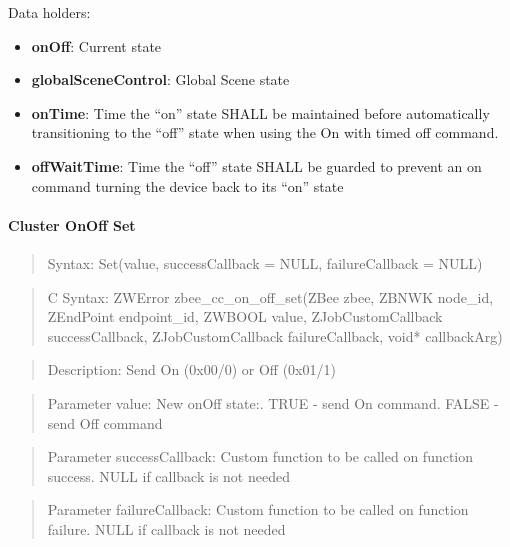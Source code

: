 \noindent
Data holders:

\begin{itemize}
\item \textbf{onOff}: Current state
\item \textbf{globalSceneControl}: Global Scene state
\item \textbf{onTime}: Time the “on” state SHALL be maintained before automatically transitioning to the “off” state when using the On with timed off command.
\item \textbf{offWaitTime}: Time the “off” state SHALL be guarded to prevent an on command turning the device back to its “on” state
\end{itemize}

\paragraph{Cluster OnOff Set}
\begin{quote}Syntax: Set(value, successCallback = NULL, failureCallback = NULL)\end{quote}
\begin{quote}C Syntax: ZWError zbee\_cc\_on\_off\_set(ZBee zbee, ZBNWK node\_id, ZEndPoint endpoint\_id, ZWBOOL value, ZJobCustomCallback successCallback, ZJobCustomCallback failureCallback, void* callbackArg)\end{quote}
\begin{quote}Description: Send On (0x00/0) or Off (0x01/1)\end{quote}
\begin{quote}Parameter value: New onOff state:. TRUE  - send On command. FALSE - send Off command\end{quote}
\begin{quote}Parameter successCallback: Custom function to be called on function success. NULL if callback is not needed\end{quote}
\begin{quote}Parameter failureCallback: Custom function to be called on function failure. NULL if callback is not needed\end{quote}



